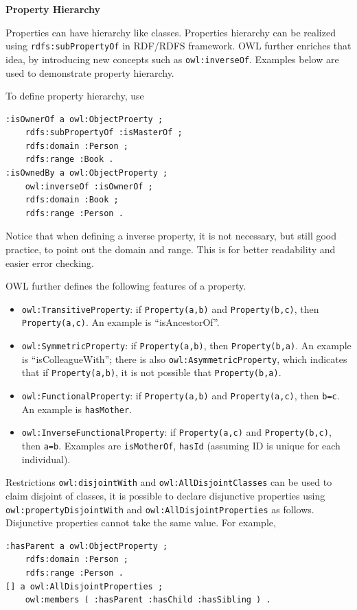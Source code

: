 \vspace{0.1in}
\noindent \textbf{Property Hierarchy}
\vspace{0.1in}

Properties can have hierarchy like classes. Properties hierarchy can be realized using \verb|rdfs:subPropertyOf| in RDF/RDFS framework. OWL further enriches that idea, by introducing new concepts such as \verb|owl:inverseOf|. Examples below are used to demonstrate property hierarchy.

To define property hierarchy, use
\begin{lstlisting}
:isOwnerOf a owl:ObjectProerty ;
	rdfs:subPropertyOf :isMasterOf ;
	rdfs:domain :Person ;
	rdfs:range :Book .
:isOwnedBy a owl:ObjectProperty ;
	owl:inverseOf :isOwnerOf ;
	rdfs:domain :Book ;
	rdfs:range :Person .
\end{lstlisting}
Notice that when defining a inverse property, it is not necessary, but still good practice, to point out the domain and range. This is for better readability and easier error checking.

OWL further defines the following features of a property.
\begin{itemize}
	\item \verb|owl:TransitiveProperty|: if \verb|Property(a,b)| and \verb|Property(b,c)|, then \verb|Property(a,c)|. An example is ``isAncestorOf''.
	\item \verb|owl:SymmetricProperty|: if \verb|Property(a,b)|, then \verb|Property(b,a)|. An example is ``isColleagueWith''; there is also \verb|owl:AsymmetricProperty|, which indicates that if \verb|Property(a,b)|, it is not possible that \verb|Property(b,a)|.
	\item \verb|owl:FunctionalProperty|: if \verb|Property(a,b)| and \verb|Property(a,c)|, then \verb|b=c|. An example is \verb|hasMother|.
	\item \verb|owl:InverseFunctionalProperty|: if \verb|Property(a,c)| and \verb|Property(b,c)|, then \verb|a=b|. Examples are \verb|isMotherOf|, \verb|hasId| (assuming ID is unique for each individual).
\end{itemize}

Restrictions \verb|owl:disjointWith| and \verb|owl:AllDisjointClasses| can be used to claim disjoint of classes, it is possible to declare disjunctive properties using \verb|owl:propertyDisjointWith| and \verb|owl:AllDisjointProperties| as follows. Disjunctive properties cannot take the same value. For example,
\begin{lstlisting}
:hasParent a owl:ObjectProperty ;
	rdfs:domain :Person ;
	rdfs:range :Person .
[] a owl:AllDisjointProperties ;
	owl:members ( :hasParent :hasChild :hasSibling ) .
\end{lstlisting}

